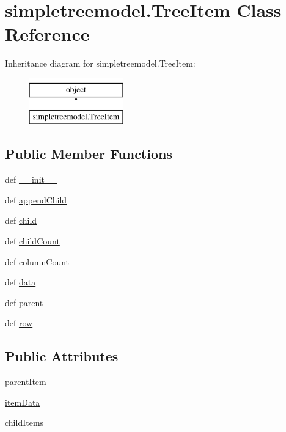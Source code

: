 \hypertarget{classsimpletreemodel_1_1TreeItem}{}\section{simpletreemodel.\+Tree\+Item Class Reference}
\label{classsimpletreemodel_1_1TreeItem}
Inheritance diagram for simpletreemodel.\+Tree\+Item\+:\begin{figure}[H]
\begin{center}
\leavevmode
\includegraphics[height=2.000000cm]{classsimpletreemodel_1_1TreeItem}
\end{center}
\end{figure}
\subsection*{Public Member Functions}
\begin{DoxyCompactItemize}
\item 
def \hyperlink{classsimpletreemodel_1_1TreeItem_a38d88ea72bf49889b4c54baacca977e8}{\+\_\+\+\_\+init\+\_\+\+\_\+}
\item 
def \hyperlink{classsimpletreemodel_1_1TreeItem_a45828e01341bf52801d457a91e907303}{append\+Child}
\item 
def \hyperlink{classsimpletreemodel_1_1TreeItem_a113160517bace646a1fc083360a622aa}{child}
\item 
def \hyperlink{classsimpletreemodel_1_1TreeItem_a487899ac5a81b3101e395d5cbc76e11a}{child\+Count}
\item 
def \hyperlink{classsimpletreemodel_1_1TreeItem_afe224d74ab417bd1934e39c1d982ae79}{column\+Count}
\item 
def \hyperlink{classsimpletreemodel_1_1TreeItem_a9c669df8f9c89e4a4c11c21db4bae2d0}{data}
\item 
def \hyperlink{classsimpletreemodel_1_1TreeItem_a0005e8729996a970e7ac50ec4d9feebe}{parent}
\item 
def \hyperlink{classsimpletreemodel_1_1TreeItem_a66c1e7dd8eb86994fcf961fe97e1bfec}{row}
\end{DoxyCompactItemize}
\subsection*{Public Attributes}
\begin{DoxyCompactItemize}
\item 
\hyperlink{classsimpletreemodel_1_1TreeItem_a8d93bb22a1c3a977f05c45d6766be391}{parent\+Item}
\item 
\hyperlink{classsimpletreemodel_1_1TreeItem_a7ab85a3cfdb8b36a9a3fd4999ce4b635}{item\+Data}
\item 
\hyperlink{classsimpletreemodel_1_1TreeItem_aeedeb33b7139e63545442e1cddec0239}{child\+Items}
\end{DoxyCompactItemize}


